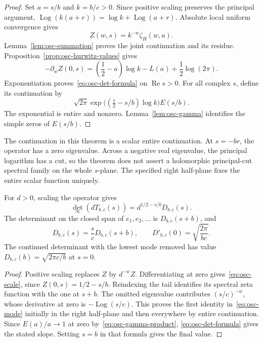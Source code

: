 \begin{proof}
Set \(a=s/b\) and \(k=b/c>0\).
Since positive scaling preserves the principal argument,
\(\operatorname{Log}(k(a+r))=\log k+\operatorname{Log}(a+r)\).
Absolute local uniform convergence gives
\[
 Z(w,s)=k^{-w}\zeta_H(w,a).
\]
Lemma~\ref{lem:osc-summation} proves the joint continuation and its
residue. Proposition~\ref{prop:osc-hurwitz-values} gives
\[
 -\partial_w Z(0,s)
 =\left(\frac12-a\right)\log k-L(a)+\frac12\log(2\pi).
\]
Exponentiation proves~\eqref{eq:osc-det-formula} on \(\operatorname{Re}s>0\).
For all complex \(s\), define its continuation by
\[
 \sqrt{2\pi}\exp\bigl((\tfrac12-s/b)\log k\bigr)E(s/b).
\]
The exponential is entire and nonzero. Lemma~\ref{lem:osc-gamma}
identifies the simple zeros of \(E(s/b)\).
\end{proof}

The continuation in this theorem is a scalar entire continuation.
At \(s=-br\), the operator has a zero eigenvalue.
Across a negative real eigenvalue, the principal logarithm has a cut,
so the theorem does not assert a holomorphic principal-cut spectral family
on the whole \(s\)-plane. The specified right half-plane fixes the entire
scalar function uniquely.

\begin{corollary}
For \(d>0\), scaling the operator gives
\begin{equation}
 \det_\infty(dT_{b,c}(s))
 =d^{1/2-s/b}D_{b,c}(s).                           \label{eq:osc-scale}
\end{equation}
The determinant on the closed span of \(e_1,e_2,\ldots\) is
\(D_{b,c}(s+b)\), and
\begin{equation}
 D_{b,c}(s)=\frac{s}{c}D_{b,c}(s+b),\qquad
 D'_{b,c}(0)=\sqrt{\frac{2\pi}{bc}}.               \label{eq:osc-mode}
\end{equation}
The continued determinant with the lowest mode removed has value
\(D_{b,c}(b)=\sqrt{2\pi c/b}\) at \(s=0\).
\end{corollary}

\begin{proof}
Positive scaling replaces \(Z\) by \(d^{-w}Z\).
Differentiating at zero gives~\eqref{eq:osc-scale}, since
\(Z(0,s)=1/2-s/b\).
Reindexing the tail identifies its spectral zeta function with the one
at \(s+b\). The omitted eigenvalue contributes \((s/c)^{-w}\), whose
derivative at zero is \(-\operatorname{Log}(s/c)\).
This proves the first identity in~\eqref{eq:osc-mode} initially in the
right half-plane and then everywhere by entire continuation.
Since \(E(a)/a\to1\) at zero by~\eqref{eq:osc-gamma-product},
\eqref{eq:osc-det-formula} gives the stated slope.
Setting \(s=b\) in that formula gives the final value.
\end{proof}

